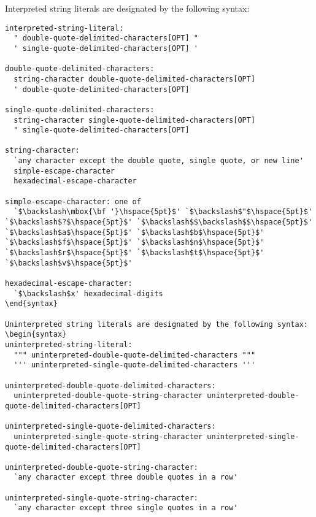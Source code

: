 \pagebreak
Interpreted string literals are designated by the following syntax:
\begin{syntax}
\begin{verbatim}
interpreted-string-literal:
  " double-quote-delimited-characters[OPT] "
  ' single-quote-delimited-characters[OPT] '

double-quote-delimited-characters:
  string-character double-quote-delimited-characters[OPT]
  ' double-quote-delimited-characters[OPT]

single-quote-delimited-characters:
  string-character single-quote-delimited-characters[OPT]
  " single-quote-delimited-characters[OPT]

string-character:
  `any character except the double quote, single quote, or new line'
  simple-escape-character
  hexadecimal-escape-character

simple-escape-character: one of
  `$\backslash\mbox{\bf '}\hspace{5pt}$' `$\backslash$"$\hspace{5pt}$' `$\backslash$?$\hspace{5pt}$' `$\backslash$$\backslash$$\hspace{5pt}$' `$\backslash$a$\hspace{5pt}$' `$\backslash$b$\hspace{5pt}$' `$\backslash$f$\hspace{5pt}$' `$\backslash$n$\hspace{5pt}$' `$\backslash$r$\hspace{5pt}$' `$\backslash$t$\hspace{5pt}$' `$\backslash$v$\hspace{5pt}$'

hexadecimal-escape-character:
  `$\backslash$x' hexadecimal-digits
\end{syntax}

Uninterpreted string literals are designated by the following syntax:
\begin{syntax}
uninterpreted-string-literal:
  """ uninterpreted-double-quote-delimited-characters """
  ''' uninterpreted-single-quote-delimited-characters '''

uninterpreted-double-quote-delimited-characters:
  uninterpreted-double-quote-string-character uninterpreted-double-quote-delimited-characters[OPT]

uninterpreted-single-quote-delimited-characters:
  uninterpreted-single-quote-string-character uninterpreted-single-quote-delimited-characters[OPT]

uninterpreted-double-quote-string-character:
  `any character except three double quotes in a row'

uninterpreted-single-quote-string-character:
  `any character except three single quotes in a row'
\end{verbatim}
\end{syntax}

